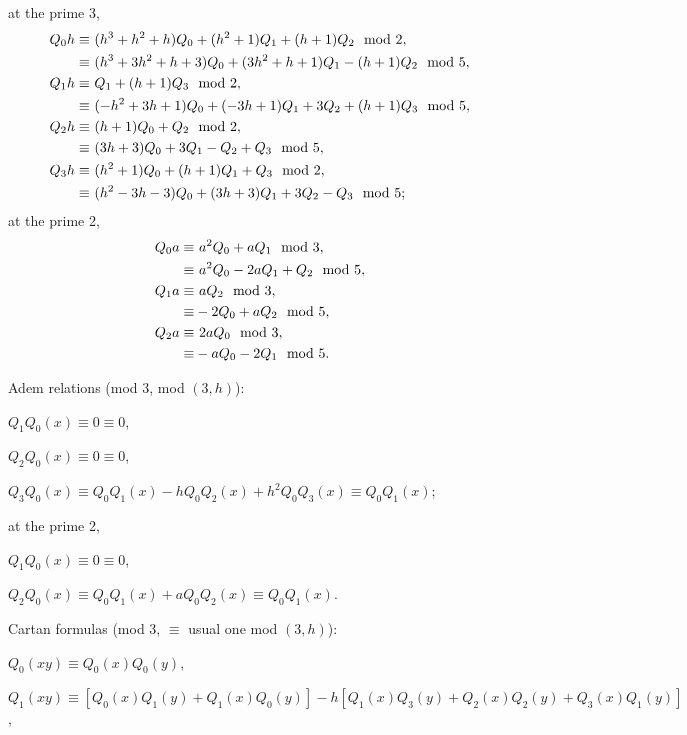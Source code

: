 \documentclass{rs}
\theoremstyle{definition}
\theoremstyle{remark}
\newcommand{\md}{~~{\rm mod}~}
\renewcommand{\=}{\approx}
\renewcommand{\-}{\sim}
\numberwithin{equation}{section}
\numberwithin{thm}{section}
\begin{document}
at the prime 3, 
\begin{equation*}
\begin{split}
 Q_0 h \equiv & ~ (h^3 + h^2 + h) Q_0 + (h^2 + 1) Q_1 + (h + 1) Q_2 \md 2, \\
       \equiv & ~ (h^3 + 3 h^2 + h + 3) Q_0 + (3 h^2 + h + 1) Q_1 - (h + 1) Q_2 \md 5, \\
 Q_1 h \equiv & ~ Q_1 + (h + 1) Q_3 \md 2, \\
       \equiv & ~ (-h^2 + 3 h + 1) Q_0 + (-3 h + 1) Q_1 + 3 Q_2 + (h + 1) Q_3 \md 5, \\
 Q_2 h \equiv & ~ (h + 1) Q_0 + Q_2 \md 2, \\
       \equiv & ~ (3 h + 3) Q_0 + 3 Q_1 - Q_2 + Q_3 \md 5, \\
 Q_3 h \equiv & ~ (h^2 + 1) Q_0 + (h + 1) Q_1 + Q_3 \md 2, \\
       \equiv & ~ (h^2 - 3 h - 3) Q_0 + (3 h + 3) Q_1 + 3 Q_2 - Q_3 \md 5; 
\end{split}
\end{equation*}
at the prime 2,
\begin{equation*}
\begin{split}
 Q_0 a \equiv & ~ a^2 Q_0 + a Q_1 \md 3, \\
       \equiv & ~ a^2 Q_0 - 2 a Q_1 + Q_2 \md 5, \\
 Q_1 a \equiv & ~ a Q_2 \md 3, \\
       \equiv & -2 Q_0 + a Q_2 \md 5, \\
 Q_2 a \equiv & ~ 2 a Q_0 \md 3, \\
       \equiv & -a Q_0 - 2 Q_1 \md 5.  
\end{split}
\end{equation*}

Adem relations (mod 3, mod $(3,h)$): 

$Q_1Q_0(x) \equiv 0 \equiv 0$,

$Q_2Q_0(x) \equiv 0 \equiv 0$,

$Q_3Q_0(x) \equiv Q_0Q_1(x) - h Q_0Q_2(x) + h^2 Q_0Q_3(x) \equiv Q_0Q_1(x)$;

at the prime 2,

$Q_1Q_0(x) \equiv 0 \equiv 0$,

$Q_2Q_0(x) \equiv Q_0Q_1(x) + a Q_0Q_2(x) \equiv Q_0Q_1(x)$.

Cartan formulas (mod 3, $\equiv$ usual one mod $(3,h)$):

$Q_0(xy) \equiv Q_0(x) Q_0(y)$,

$Q_1(xy) \equiv [Q_0(x) Q_1(y) + Q_1(x) Q_0(y)] - h [Q_1(x) Q_3(y) + Q_2(x) Q_2(y) + Q_3(x) Q_1(y)]$,
\end{document}
